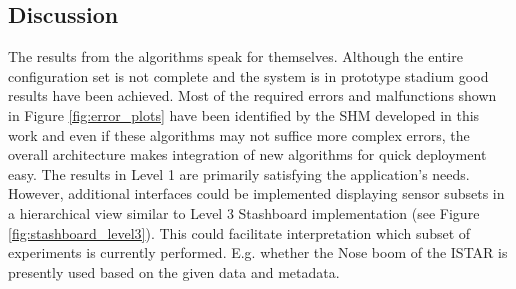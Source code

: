\subsection{Discussion}
The results from the algorithms speak for themselves. Although the entire configuration set is not complete and the system is in prototype stadium good results have been achieved. Most of the required errors and malfunctions shown in Figure \ref{fig:error_plots} have been identified by the SHM developed in this work and even if these algorithms may not suffice more complex errors, the overall architecture makes integration of new algorithms for quick deployment easy.
The results in Level 1 are primarily satisfying the application's needs. However, additional interfaces could be implemented displaying sensor subsets in a hierarchical view similar to Level 3 Stashboard implementation (see Figure \ref{fig:stashboard_level3}). This could facilitate interpretation which subset of experiments is currently performed. E.g. whether the Nose boom of the ISTAR is presently used based on the given data and metadata.

